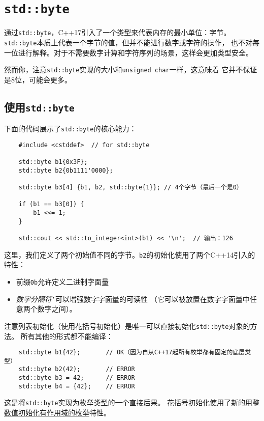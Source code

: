 \section{\texttt{std::byte}}\label{ch18}
通过\texttt{std::byte}，C++17引入了一个类型来代表内存的最小单位：字节。
\texttt{std::byte}本质上代表一个字节的值，但并不能进行数字或字符的操作，
也不对每一位进行解释。对于不需要数字计算和字符序列的场景，这样会更加类型安全。

然而你，注意\texttt{std::byte}实现的大小和\texttt{unsigned char}一样，这意味着
它并不保证是8位，可能会更多。

\subsection{使用\texttt{std::byte}}
下面的代码展示了\texttt{std::byte}的核心能力：
\begin{lstlisting}
    #include <cstddef>  // for std::byte

    std::byte b1{0x3F};
    std::byte b2{0b1111'0000};

    std::byte b3[4] {b1, b2, std::byte{1}}; // 4个字节（最后一个是0）

    if (b1 == b3[0]) {
        b1 <<= 1;
    }

    std::cout << std::to_integer<int>(b1) << '\n';  // 输出：126
\end{lstlisting}
这里，我们定义了两个初始值不同的字节。\texttt{b2}的初始化使用了两个C++14引入的特性：
\begin{itemize}[leftmargin=*]
    \item 前缀\texttt{0b}允许定义二进制字面量
    \item \emph{数字分隔符}\texttt{'}可以增强数字字面量的可读性
    （它可以被放置在数字字面量中任意两个数字之间）。
\end{itemize}
注意列表初始化（使用花括号初始化）是唯一可以直接初始化\texttt{std::byte}对象的方法。
所有其他的形式都不能编译：
\begin{lstlisting}
    std::byte b1{42};       // OK（因为自从C++17起所有枚举都有固定的底层类型）
    std::byte b2(42);       // ERROR
    std::byte b3 = 42;      // ERROR
    std::byte b4 = {42};    // ERROR
\end{lstlisting}
这是将\texttt{std::byte}实现为枚举类型的一个直接后果。
花括号初始化使用了新的\hyperref[ch8.3]{用整数值初始化有作用域的枚举}特性。

